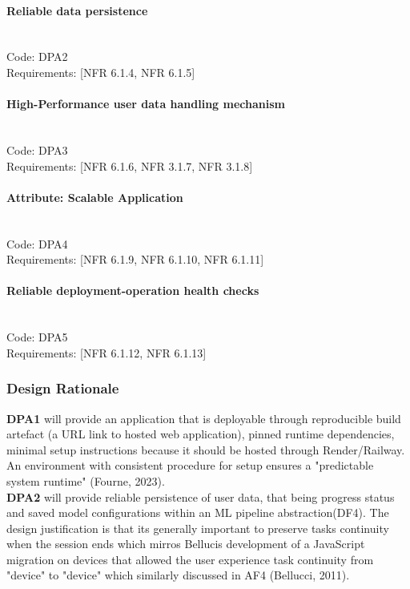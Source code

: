 \documentclass{article}
\begin{document}
\paragraph{Reliable data persistence}  \mbox{} \\
\noindent Code: DPA2 \\
\noindent Requirements: [NFR 6.1.4, NFR 6.1.5]

\paragraph{High-Performance user data handling mechanism} \mbox{} \\
\noindent Code: DPA3 \\
\noindent Requirements: [NFR 6.1.6, NFR 3.1.7, NFR 3.1.8]

\paragraph{Attribute: Scalable Application} \mbox{} \\
\noindent Code: DPA4 \\
\noindent Requirements: [NFR 6.1.9, NFR 6.1.10, NFR 6.1.11]

\paragraph{Reliable deployment-operation health checks} \mbox{} \\
\noindent Code: DPA5 \\
\noindent Requirements: [NFR 6.1.12, NFR 6.1.13]
\subsubsection{Design Rationale}
\textbf{DPA1} will provide an application that is deployable through reproducible build artefact (a URL link to hosted web application), pinned runtime dependencies, minimal setup instructions because it should be hosted through Render/Railway. An environment with consistent procedure for setup ensures a "predictable system runtime" (Fourne, 2023). \\

\textbf{DPA2} will provide reliable persistence of user data, that being progress status and saved model configurations within an ML pipeline abstraction(DF4). The design justification is that its generally important to preserve tasks continuity when the session ends which mirros Bellucis development of a JavaScript migration on devices that allowed the user experience task continuity from "device" to "device" which similarly discussed in AF4 (Bellucci, 2011).\\
\end{document}
